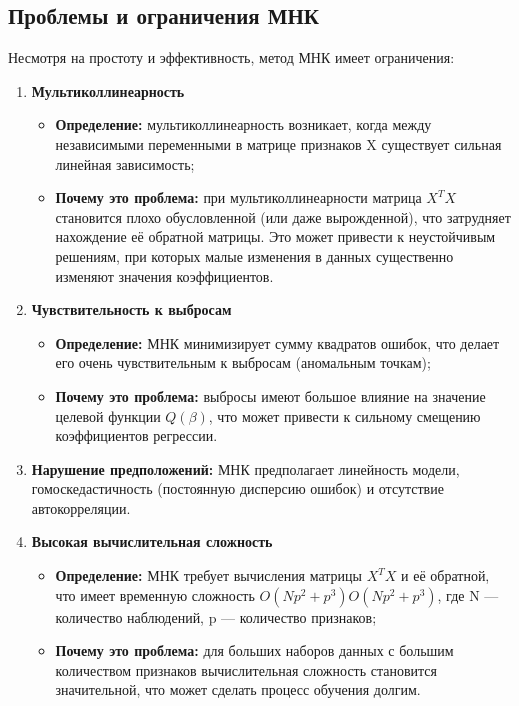 \subsection{Проблемы и ограничения МНК}

Несмотря на простоту и эффективность, метод МНК имеет ограничения:

\begin{enumerate}

    \item \textbf{Мультиколлинеарность}
		\begin{itemize}
			\item \textbf{Определение:} мультиколлинеарность возникает, когда между независимыми переменными в матрице признаков X существует сильная линейная зависимость;
			\item \textbf{Почему это проблема:} при мультиколлинеарности матрица \(X^T X\) становится плохо обусловленной (или даже вырожденной), что затрудняет нахождение её обратной матрицы. Это может привести к неустойчивым решениям, при которых малые изменения в данных существенно изменяют значения коэффициентов.
		\end{itemize}

	\item \textbf{Чувствительность к выбросам}
		\begin{itemize}
			\item \textbf{Определение:} МНК минимизирует сумму квадратов ошибок, что делает его очень чувствительным к выбросам (аномальным точкам);
			\item \textbf{Почему это проблема:} выбросы имеют большое влияние на значение целевой функции \(Q(\beta)\), что может привести к сильному смещению коэффициентов регрессии.
		\end{itemize}

	\item \textbf{Нарушение предположений:} МНК предполагает линейность модели, гомоскедастичность (постоянную дисперсию ошибок) и отсутствие автокорреляции.

	\item \textbf{Высокая вычислительная сложность}
		\begin{itemize}
			\item \textbf{Определение:} МНК требует вычисления матрицы \(X^T X\) и её обратной, что имеет временную сложность \(O(Np^2+p^3)O(Np^2+p^3)\), где N — количество наблюдений, p — количество признаков;
			\item \textbf{Почему это проблема:} для больших наборов данных с большим количеством признаков вычислительная сложность становится значительной, что может сделать процесс обучения долгим.
		\end{itemize}

\end{enumerate}


